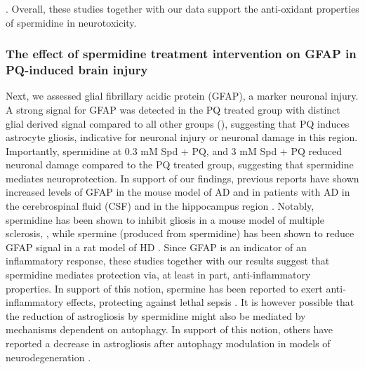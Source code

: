 \citep{Jamwal2016}. Overall, these studies together with our data support the anti-oxidant properties of spermidine in neurotoxicity.

\subsubsection{The effect of spermidine treatment intervention on GFAP in PQ-induced brain injury}
Next, we assessed glial fibrillary acidic protein (GFAP), a marker neuronal injury. A strong signal for GFAP was detected in the PQ treated group with distinct glial derived signal compared to all other groups (), suggesting that PQ induces astrocyte gliosis, indicative for neuronal injury or neuronal damage in this region. Importantly, spermidine at 0.3 mM Spd + PQ, and 3 mM Spd + PQ reduced neuronal damage compared to the PQ treated group, suggesting that spermidine mediates neuroprotection. In support of our findings, previous reports have shown increased levels of GFAP in the mouse model of AD \citep{Kamphuis2014,Kamphuis2012} and in patients with AD in the cerebrospinal fluid (CSF) \citep{Colangelo2014,Fukuyama2001,Ishiki2016} and in the hippocampus region \citep{Kamphuis2014}. Notably, spermidine has been shown to inhibit gliosis in a mouse model of multiple sclerosis, \citep{Guo2011}, while spermine (produced from spermidine) has been shown to reduce GFAP signal in a rat model of HD \citep{Velloso2009}. Since GFAP is an indicator of an inflammatory response, these studies together with our results suggest that spermidine mediates protection via, at least in part, anti-inflammatory properties. In support of this notion, spermine has been reported to exert anti-inflammatory effects, protecting against lethal sepsis \citep{Zhu2009}. It is however possible that the reduction of astrogliosis by spermidine might also be mediated by mechanisms dependent on autophagy. In support of this notion, others have reported a decrease in astrogliosis after autophagy modulation in models of neurodegeneration \citep{Castillo2013,Rodriguez-Navarro2010,Wang2012}. 

